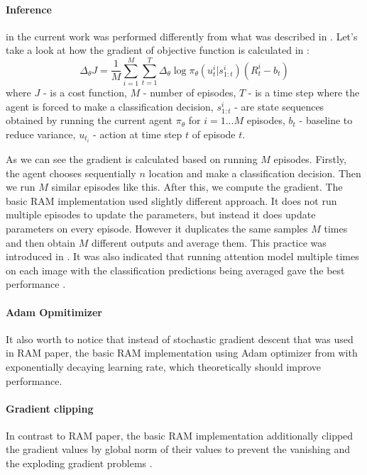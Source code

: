 \paragraph{Inference} in the current work was performed differently from what was
described in \cite{DBLP:journals/corr/MnihHGK14}.
Let's take a look at how the gradient of objective function is calculated in \cite{DBLP:journals/corr/MnihHGK14}:
\begin{equation} \label{eq:}
	\Delta_{\theta} J = \frac{1}{M} \sum_{i=1}^M \sum_{t=1}^T
		\Delta_{\theta} \log \pi_{\theta}(u_t^i| s_{1:t}^i) (R_t^i - b_t)
\end{equation}
where $J$ - is a cost function, $M$ - number of episodes,
$T$ - is a time step where the agent is forced to make a classification decision,
$s_{1:t}^i$ - are state sequences obtained by
running the current agent $\pi_{\theta}$ for $i = 1 . . .M$ episodes,
$b_t$ - baseline to reduce variance, $u_t_i$ - action at time step $t$
of episode $t$.

As we can see the gradient is calculated based on running $M$ episodes.
Firstly, the agent chooses sequentially $n$ location and make a classification
decision. Then we run $M$ similar episodes like this. After this,
we compute the gradient. The basic RAM implementation used slightly different
approach. It does not run multiple episodes to update the parameters, but instead
it does update parameters on every episode. However it duplicates the same
samples $M$ times and then obtain $M$ different outputs and average them.
This practice was introduced in \cite{DBLP:journals/corr/BaMK14}.
It was also indicated that running attention model multiple times on each
image with the classification predictions being averaged gave the best
performance \cite{DBLP:journals/corr/BaMK14}.


\paragraph{Adam Opmitimizer} It also worth to notice that instead of stochastic
gradient descent that was used in RAM paper, the basic RAM implementation using Adam optimizer
from \cite{DBLP:journals/corr/KingmaB14} with exponentially decaying learning rate,
which theoretically should improve performance. \cite{DBLP:journals/corr/KingmaB14}


\paragraph{Gradient clipping} In contrast to RAM paper, the basic RAM implementation
additionally clipped the gradient values by global norm of their values to prevent the vanishing
and the exploding gradient problems \cite{Pascanu2012}.


